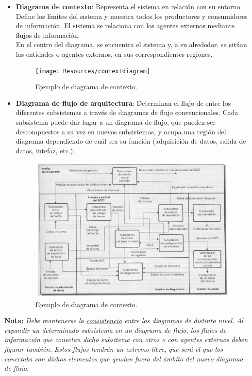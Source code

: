 \begin{itemize}
    \item \textbf{Diagrama de contexto}: Representa el sistema en relación con su entorno. Define los límites del sistema y muestra todos los productores y consumidores de información. El sistema se relaciona con los agentes externos mediante flujos de información.\\
    En el centro del diagrama, se encuentra el sistema y, a su alrededor, se sitúan las entidades o agentes externos, en sus correspondientes regiones.
        \begin{figure}[H]
            \centering
            \texttt{[image: Resources/contextdiagram]}
            \caption{Ejemplo de diagrama de contexto.}
            \label{fig:diagramaDeContexto}
        \end{figure}
    \item \textbf{Diagrama de flujo de arquitectura}: Determinan el flujo de entre los diferentes subsistemas a través de diagramas de flujo convencionales. Cada subsistema puede dar lugar a un diagrama de flujo, que pueden ser descompuestos a su vez en nuevos subsistemas, y ocupa una región del diagrama dependiendo de cuál sea su función (adquisición de datos, salida de datos, intefaz, etc.).
        \begin{figure}[H]
            \centering
            \includegraphics[width=0.8\linewidth]{Resources/Tema4/diagramaFlujo.png}
            \caption{Ejemplo de diagrama de contexto.}
            \label{fig:diagramaDeContexto}
        \end{figure}
\end{itemize}

\textbf{Nota:} \textit{Debe mantenerse la \uline{consistencia} entre los diagramas de distinto nivel. Al expandir un determinado subsistema en un diagrama de flujo, los flujos de información que conectan dicho subsitema con otros o con agentes externos deben figurar también. Estos flujos tendrán un extremo libre, que será el que los conectaba con dichos elementos que qeudan fuera del ámbito del nuevo diagrama de flujo.
}

